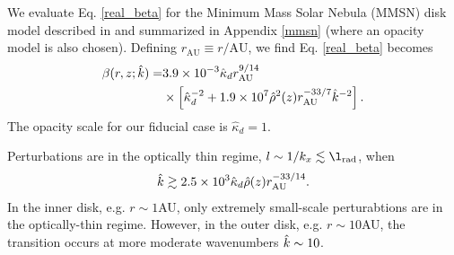 We evaluate Eq. \ref{real_beta} for the Minimum Mass Solar Nebula
(MMSN) disk model described in \cite{chiang10} and summarized in
Appendix \ref{mmsn} (where an opacity model is also chosen). Defining
$r_\mathrm{AU}\equiv r/\mathrm{AU}$, we find Eq. \ref{real_beta}
becomes 
\begin{align}\label{beta_mmsn_simp}
  \beta(r,z;\hat{k})\notag = &3.9\times10^{-3}\hat{\kappa}_d
  r_\mathrm{AU}^{9/14}
  \notag\\ &\times \left[\hat{\kappa}_d^{-2} +
    1.9\times10^7\hat{\rho}^2(z)r_\mathrm{AU}^{-33/7}\hat{k}^{-2}\right]. 
\end{align}
The opacity scale for our fiducial case is $\hat{\kappa}_d=1$.    

Perturbations are in the optically thin regime,
$l\sim 1/k_x \lesssim\l_\mathrm{rad}$, when 
\begin{align}
  \hat{k}\gtrsim 2.5\times10^3\hat{\kappa}_d\hat{\rho}(z)r_\mathrm{AU}^{-33/14}.  
\end{align}
In the inner disk, e.g. $r\sim 1$AU, only
extremely small-scale perturabtions are in the optically-thin
regime. However, in the outer disk, e.g. $r\sim 10$AU, the transition
occurs at more moderate wavenumbers $\hat{k}\sim 10$.


